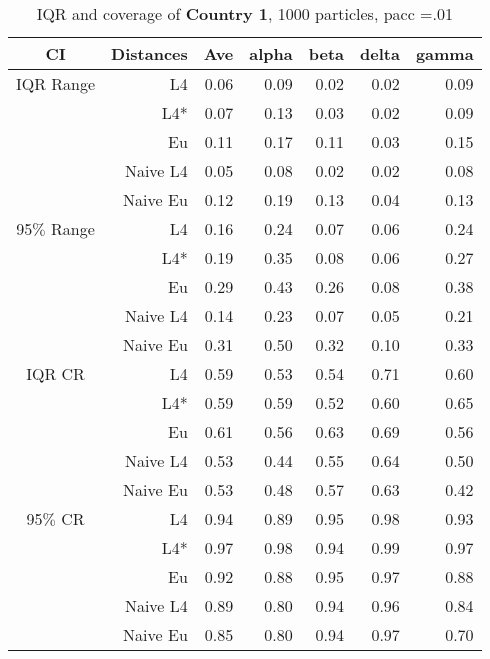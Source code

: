 \documentclass[a4paper,12pt,twoside]{book}
\begin{document}
\begin{table}[H]
\centering
\caption{IQR and coverage of \textbf{Country 1}, 1000 particles, pacc =.01}

\begin{tabular}{crrrrrr}
  \hline
{\color{blue}CI} & Distances & Ave & alpha & beta & delta & gamma \\ 
  \hline
{\color{blue}IQR Range} & L4  &0.06 & 0.09 & 0.02 & 0.02 & 0.09 \\ 
   
&L4*  &0.07 & 0.13 & 0.03 & 0.02 & 0.09 \\ 
 
&Eu &      0.11 & 0.17 & 0.11 & 0.03 & 0.15 \\ 
  
&Naive L4&0.05 & 0.08 & 0.02 & 0.02 & 0.08 \\ 
  
&Naive Eu &  0.12 & 0.19 & 0.13 & 0.04 & 0.13 \\ 
  
  
    {\color{blue}95$\%$ Range} & L4  &0.16 & 0.24 & 0.07 & 0.06 & 0.24 \\ 
  
    &L4*  &0.19 & 0.35 & 0.08 & 0.06 & 0.27 \\ 
  
&Eu &  0.29 & 0.43 & 0.26 & 0.08 & 0.38 \\ 
 
&Naive L4&    0.14 & 0.23 & 0.07 & 0.05 & 0.21 \\
 
&Naive Eu &   0.31 & 0.50 & 0.32 & 0.10 & 0.33 \\ 
  
   \hline
   
{\color{blue} IQR CR } & L4  &0.59 & 0.53 & 0.54 & 0.71 & 0.60 \\ 
  

&L4*  &   0.59 & 0.59 & 0.52 & 0.60 & 0.65 \\ 
  
 
&Eu &    0.61 & 0.56 & 0.63 & 0.69 & 0.56 \\ 
  
&Naive L4&   0.53 & 0.44 & 0.55 & 0.64 & 0.50 \\ 
&Naive Eu & 0.53 & 0.48 & 0.57 & 0.63 & 0.42 \\ 
 

 {\color{blue} 95$\%$ CR }& L4  &0.94 & 0.89 & 0.95 & 0.98 & 0.93 \\ 
  
 
  &L4*  &    0.97 & 0.98 & 0.94 & 0.99 & 0.97 \\ 
 
&Eu &    0.92 & 0.88 & 0.95 & 0.97 & 0.88 \\ 
 
&Naive L4&   0.89 & 0.80 & 0.94 & 0.96 & 0.84 \\
 
&Naive Eu &    0.85 & 0.80 & 0.94 & 0.97 & 0.70 \\ 
 
\end{tabular}

\end{table}
\end{document}
